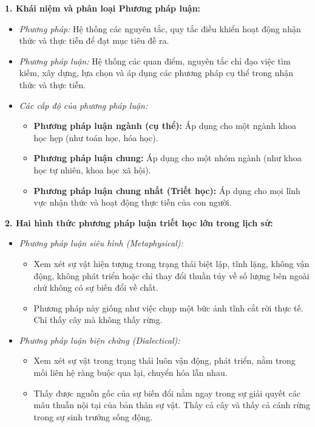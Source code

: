 \documentclass[12pt,a4paper]{article}
\begin{document}
{\noindent
\textbf{1. Khái niệm và phân loại Phương pháp luận:}
\begin{itemize}
    \item \textit{Phương pháp:} Hệ thống các nguyên tắc, quy tắc điều khiển hoạt động nhận thức và thực tiễn để đạt mục tiêu đề ra.
    \item \textit{Phương pháp luận:} Hệ thống các quan điểm, nguyên tắc chỉ đạo việc tìm kiếm, xây dựng, lựa chọn và áp dụng các phương pháp cụ thể trong nhận thức và thực tiễn.
    \item \textit{Các cấp độ của phương pháp luận:}
    \begin{itemize}
        \item \textbf{Phương pháp luận ngành (cụ thể):} Áp dụng cho một ngành khoa học hẹp (như toán học, hóa học).
        \item \textbf{Phương pháp luận chung:} Áp dụng cho một nhóm ngành (như khoa học tự nhiên, khoa học xã hội).
        \item \textbf{Phương pháp luận chung nhất (Triết học):} Áp dụng cho mọi lĩnh vực nhận thức và hoạt động thực tiễn của con người.
    \end{itemize}
\end{itemize}

\noindent
\textbf{2. Hai hình thức phương pháp luận triết học lớn trong lịch sử:}
\begin{itemize}
    \item \textit{Phương pháp luận siêu hình (Metaphysical):}
    \begin{itemize}
        \item Xem xét sự vật hiện tượng trong trạng thái biệt lập, tĩnh lặng, không vận động, không phát triển hoặc chỉ thay đổi thuần túy về số lượng bên ngoài chứ không có sự biến đổi về chất.
        \item Phương pháp này giống như việc chụp một bức ảnh tĩnh cắt rời thực tế. Chỉ thấy cây mà không thấy rừng.
    \end{itemize}
    \item \textit{Phương pháp luận biện chứng (Dialectical):}
    \begin{itemize}
        \item Xem xét sự vật trong trạng thái luôn vận động, phát triển, nằm trong mối liên hệ ràng buộc qua lại, chuyển hóa lẫn nhau.
        \item Thấy được nguồn gốc của sự biến đổi nằm ngay trong sự giải quyết các mâu thuẫn nội tại của bản thân sự vật. Thấy cả cây và thấy cả cánh rừng trong sự sinh trưởng sống động.
    \end{itemize}
\end{itemize}

}
\end{document}

